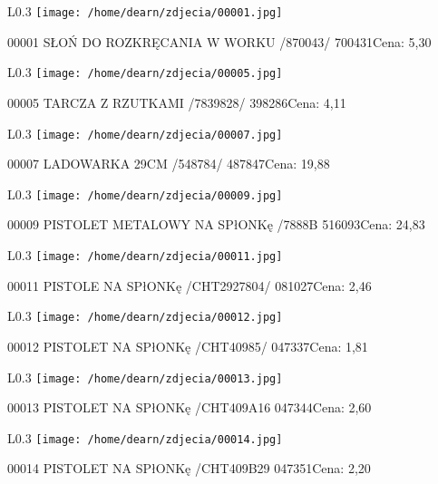\begin{wrapfigure}{L}{0.3\textwidth}
\texttt{[image: /home/dearn/zdjecia/00001.jpg]}
\end{wrapfigure}
00001 SŁOŃ DO ROZKRĘCANIA W WORKU /870043/            700431Cena: 5,30\newline
\begin{wrapfigure}{L}{0.3\textwidth}
\texttt{[image: /home/dearn/zdjecia/00005.jpg]}
\end{wrapfigure}
00005 TARCZA Z RZUTKAMI /7839828/                     398286Cena: 4,11\newline
\begin{wrapfigure}{L}{0.3\textwidth}
\texttt{[image: /home/dearn/zdjecia/00007.jpg]}
\end{wrapfigure}
00007 LADOWARKA 29CM /548784/                         487847Cena: 19,88\newline
\begin{wrapfigure}{L}{0.3\textwidth}
\texttt{[image: /home/dearn/zdjecia/00009.jpg]}
\end{wrapfigure}
00009 PISTOLET METALOWY NA SPłONKę  /7888B            516093Cena: 24,83\newline
\begin{wrapfigure}{L}{0.3\textwidth}
\texttt{[image: /home/dearn/zdjecia/00011.jpg]}
\end{wrapfigure}
00011 PISTOLE NA SPłONKę    /CHT2927804/              081027Cena: 2,46\newline
\begin{wrapfigure}{L}{0.3\textwidth}
\texttt{[image: /home/dearn/zdjecia/00012.jpg]}
\end{wrapfigure}
00012 PISTOLET NA SPłONKę /CHT40985/                  047337Cena: 1,81\newline
\begin{wrapfigure}{L}{0.3\textwidth}
\texttt{[image: /home/dearn/zdjecia/00013.jpg]}
\end{wrapfigure}
00013 PISTOLET NA SPłONKę /CHT409A16                  047344Cena: 2,60\newline
\begin{wrapfigure}{L}{0.3\textwidth}
\texttt{[image: /home/dearn/zdjecia/00014.jpg]}
\end{wrapfigure}
00014 PISTOLET NA SPłONKę /CHT409B29                  047351Cena: 2,20\newline
